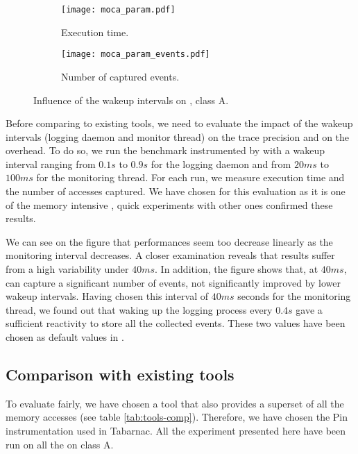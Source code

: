 \begin{figure}[htb]
    \centering
    \begin{subfigure}{\linewidth}
        \texttt{[image: moca\_param.pdf]}
        \caption{Execution time.}
        \label{fig:param_time}
    \end{subfigure}

    \begin{subfigure}{\linewidth}
        \texttt{[image: moca\_param\_events.pdf]}
        \caption{Number of captured events.}
        \label{fig:param_evts}
    \end{subfigure}
    \caption{Influence of the wakeup intervals on \IS, class A.}
    \label{fig:param}
\end{figure}

Before comparing \Moca to existing tools, we need to evaluate the impact of
the wakeup intervals (logging daemon and monitor thread) on the trace
precision and on the overhead. To do so, we run the \IS benchmark instrumented by \Moca with
a wakeup interval ranging from $0.1s$ to  $0.9s$ for the logging daemon and from $20ms$ to
$100ms$ for the monitoring thread. For each run, we measure \IS execution time and the number of
accesses captured. We have chosen \IS for this evaluation as it is one of the memory intensive \NPB,
quick experiments with other ones confirmed these results.

We can see on the figure  that performances seem too decrease linearly
as the monitoring interval decreases. A closer examination reveals that results
suffer from a high variability under $40ms$. 
In addition, the figure  shows
that, at $40ms$, \Moca can capture a significant number of events, not significantly improved
by lower wakeup intervals. Having chosen this interval of $40ms$ seconds for the monitoring thread,
we found out that waking up the logging process every $0.4s$ gave a sufficient reactivity to store
all the collected events.
These two values have been chosen as default values in \Moca.

\subsection{Comparison with existing tools}

To evaluate \Moca fairly, we have chosen a tool that also provides a superset of
all the memory accesses (see table \ref{tab:tools-comp}). Therefore, we have chosen the Pin
instrumentation used in Tabarnac. All the experiment presented here have been run on
all the \NPB on class A.

